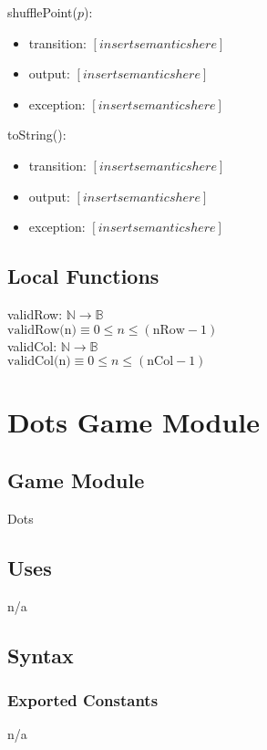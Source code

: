 \documentclass[12pt]{article}
\begin{document}
\noindent shufflePoint($p$):
\begin{itemize}
    \item transition: $[insert semantics here]$
    \item output: $[insert semantics here]$
    \item exception: $[insert semantics here]$
\end{itemize}

\noindent toString():
\begin{itemize}
    \item transition: $[insert semantics here]$
    \item output: $[insert semantics here]$
    \item exception: $[insert semantics here]$
\end{itemize}


\subsection*{Local Functions}
validRow: $\mathbb{N} \rightarrow \mathbb{B}$\\
$\mbox{validRow(n)} \equiv 0 \leq n \leq (\mbox{nRow} - 1)$\\

validCol: $\mathbb{N} \rightarrow \mathbb{B}$\\
$\mbox{validCol(n)} \equiv 0 \leq n \leq (\mbox{nCol} - 1)$\\



\newpage
\section* {Dots Game Module}
\subsection*{Game Module}
Dots


\subsection* {Uses}
n/a


\subsection* {Syntax}
\subsubsection* {Exported Constants}
n/a
\end{document}
